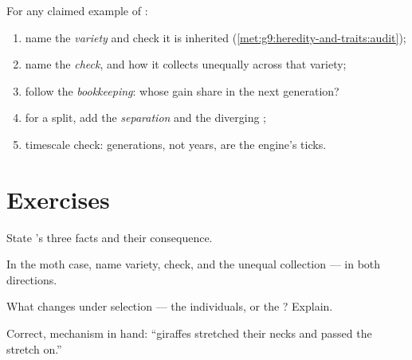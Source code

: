 \begin{method}\label{met:g9:how-species-change:run}
For any claimed example of :
\begin{enumerate}
  \item name the \emph{variety} and check it is inherited
        (\cref{met:g9:heredity-and-traits:audit});
  \item name the \emph{check}, and how it collects
        unequally across that variety;
  \item follow the \emph{bookkeeping}: whose  gain
        share in the next generation?
  \item for a split, add the \emph{separation} and the
        diverging ;
  \item timescale check: generations, not years, are the
        engine's ticks.
\end{enumerate}
\end{method}

\section{Exercises}

\begin{exercise}[$\star$]\label{exo:g9:how-species-change:1}
State 's three facts and their
consequence.
\end{exercise}

\begin{exercise}[$\star$]\label{exo:g9:how-species-change:2}
In the moth case, name variety, check, and the unequal
collection --- in both directions.
\end{exercise}

\begin{exercise}[$\star$]\label{exo:g9:how-species-change:3}
What changes under selection --- the individuals, or the
? Explain.
\end{exercise}

\begin{exercise}[$\star$]\label{exo:g9:how-species-change:4}
Correct, mechanism in hand: ``giraffes stretched their
necks and passed the stretch on.''
\end{exercise}

